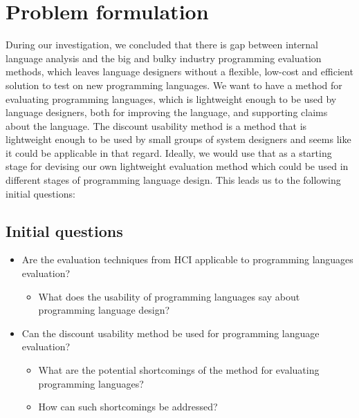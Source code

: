 \section{Problem formulation}
\label{section:problem formulation}
During our investigation, we concluded that there is gap between internal language analysis and the big and bulky industry programming evaluation methods\cite{AliceCS1}\cite{BlockOrNot}\cite{FromScratch}, which leaves language designers without a flexible, low-cost and efficient solution to test on new programming languages. We want to have a method for evaluating programming languages, which is lightweight enough to be used by language designers, both for improving the language, and supporting claims about the language. The discount usability method is a method that is lightweight enough to be used by small groups of system designers and seems like it could be applicable in that regard. Ideally, we would use that as a starting stage for devising our own lightweight evaluation method which could be used in different stages of programming language design. This leads us to the following initial questions:

\subsection{Initial questions}
\begin{itemize}
\item Are the evaluation techniques from HCI applicable to programming languages evaluation?
	\begin{itemize}
		\item What does the usability of programming languages say about programming language design?
	\end{itemize}
\item Can the discount usability method be used for programming language evaluation?
	\begin{itemize}
		\item What are the potential shortcomings of the method for evaluating programming languages?
		\item How can such shortcomings be addressed?
	\end{itemize}
\end{itemize}
